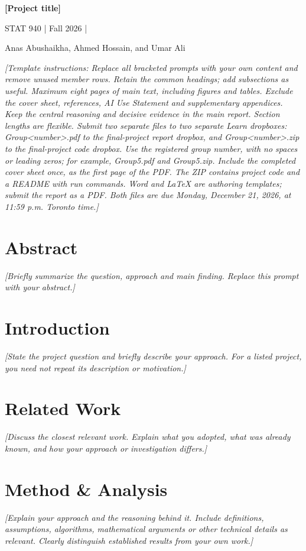 \documentclass[12pt,letterpaper]{article}
\newcommand{\prompt}[1]{{\interlinepenalty=10000\textit{[#1]}\par}}
\begin{document}
\pagestyle{empty}


\clearpage
\pagestyle{plain}
\setcounter{page}{1}
{\fontsize{16}{18}\selectfont\bfseries [Project title]}\par
STAT 940 \quad | \quad Fall 2026 \quad | 

Anas Abushaikha, Ahmed Hossain, and Umar Ali

\prompt{Template instructions: Replace all bracketed prompts with your own content and remove unused member rows. Retain the common headings; add subsections as useful. Maximum eight pages of main text, including figures and tables. Exclude the cover sheet, references, AI Use Statement and supplementary appendices. Keep the central reasoning and decisive evidence in the main report. Section lengths are flexible. Submit two separate files to two separate Learn dropboxes: Group\textless{}number\textgreater{}.pdf to the final-project report dropbox, and Group\textless{}number\textgreater{}.zip to the final-project code dropbox. Use the registered group number, with no spaces or leading zeros; for example, Group5.pdf and Group5.zip. Include the completed cover sheet once, as the first page of the PDF. The ZIP contains project code and a README with run commands. Word and LaTeX are authoring templates; submit the report as a PDF. Both files are due Monday, December 21, 2026, at 11:59 p.m. Toronto time.}

\section*{Abstract}
\prompt{Briefly summarize the question, approach and main finding. Replace this prompt with your abstract.}

\section{Introduction}
\prompt{State the project question and briefly describe your approach. For a listed project, you need not repeat its description or motivation.}

\section{Related Work}
\prompt{Discuss the closest relevant work. Explain what you adopted, what was already known, and how your approach or investigation differs.}

\section{Method \& Analysis}
\prompt{Explain your approach and the reasoning behind it. Include definitions, assumptions, algorithms, mathematical arguments or other technical details as relevant. Clearly distinguish established results from your own work.}
\end{document}
